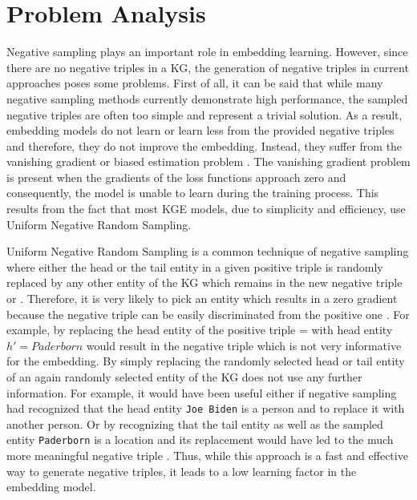 \section{Problem Analysis}
\label{sec:problem_analysis}

Negative sampling plays an important role in embedding learning.
However, since there are no negative triples in a \ac{KG}, the generation of negative triples in current approaches poses some problems.
First of all, it can be said that while many negative sampling methods currently demonstrate high performance, the sampled negative triples are often too simple and represent a trivial solution. 
As a result, embedding models do not learn or learn less from the provided negative triples and therefore, they do not improve the embedding.
Instead, they suffer from the vanishing gradient or biased estimation problem \cite{zhang2021efficient}.
The vanishing gradient problem is present when the gradients of the loss functions approach zero and consequently, the model is unable to learn during the training process.
This results from the fact that most \ac{KGE} models, due to simplicity and efficiency, use Uniform Negative Random Sampling.

Uniform Negative Random Sampling is a common technique of negative sampling where either the head or the tail entity in a given positive triple  is randomly replaced by any other entity of the \ac{KG} which remains in the new negative triple  or . 
Therefore, it is very likely to pick an entity which results in a zero gradient because the negative triple can be easily discriminated from the positive one \cite{cai2017kbgan}.
For example, by replacing the head entity of the positive triple  =  with head entity $h' = Paderborn$ would result in the negative triple  which is not very informative for the embedding.
By simply replacing the randomly selected head or tail entity of an again randomly selected entity of the \ac{KG} does not use any further information.
For example, it would have been useful either if negative sampling had recognized that the head entity \texttt{Joe Biden} is a person and to replace it with another person.
Or by recognizing that the tail entity as well as the sampled entity \texttt{Paderborn} is a location and its replacement would have led to the much more meaningful negative triple .  
Thus, while this approach is a fast and effective way to generate negative triples, it leads to a low learning factor in the embedding model.


